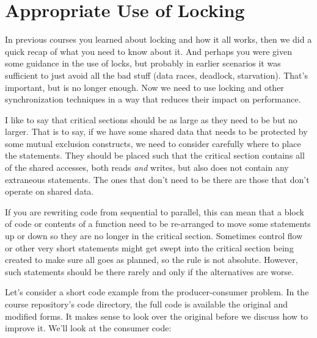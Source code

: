 




\section*{Appropriate Use of Locking}

In previous courses you learned about locking and how it all works, then we did a quick recap of what you need to know about it. And perhaps you were given some guidance in the use of locks, but probably in earlier scenarios it was sufficient to just avoid all the bad stuff (data races, deadlock, starvation). That's important, but is no longer enough. Now we need to use locking and other synchronization techniques in a way that reduces their impact on performance.

I like to say that critical sections should be as large as they need to be but no larger. That is to say, if we have some shared data that needs to be protected by some mutual exclusion constructs, we need to consider carefully where to place the statements. They should be placed such that the critical section contains all of the shared accesses, both reads \textit{and} writes, but also does not contain any extraneous statements. The ones that don't need to be there are those that don't operate on shared data.

If you are rewriting code from sequential to parallel, this can mean that a block of code or contents of a function need to be re-arranged to move some statements up or down so they are no longer in the critical section. Sometimes control flow or other very short statements might get swept into the critical section being created to make sure all goes as planned, so the rule is not absolute. However, such statements should be there rarely and only if the alternatives are worse.

Let's consider a short code example from the producer-consumer problem. In the course repository's code directory, the full code is available the original and modified forms. It makes sense to look over the original before we discuss how to improve it. We'll look at the consumer code:

